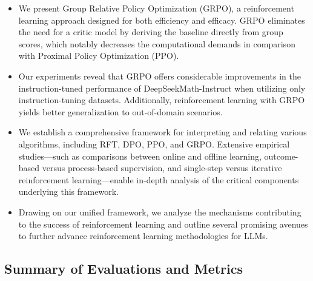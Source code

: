\begin{itemize}[topsep=0pt]
    \item We present Group Relative Policy Optimization (GRPO), a reinforcement learning approach designed for both efficiency and efficacy. GRPO eliminates the need for a critic model by deriving the baseline directly from group scores, which notably decreases the computational demands in comparison with Proximal Policy Optimization (PPO).
    \item Our experiments reveal that GRPO offers considerable improvements in the instruction-tuned performance of DeepSeekMath-Instruct when utilizing only instruction-tuning datasets. Additionally, reinforcement learning with GRPO yields better generalization to out-of-domain scenarios.
    \item We establish a comprehensive framework for interpreting and relating various algorithms, including RFT, DPO, PPO, and GRPO. Extensive empirical studies—such as comparisons between online and offline learning, outcome-based versus process-based supervision, and single-step versus iterative reinforcement learning—enable in-depth analysis of the critical components underlying this framework.
    \item Drawing on our unified framework, we analyze the mechanisms contributing to the success of reinforcement learning and outline several promising avenues to further advance reinforcement learning methodologies for LLMs.
\end{itemize}

\subsection{Summary of Evaluations and Metrics}

